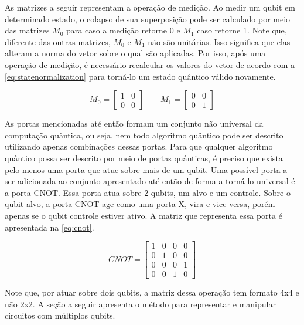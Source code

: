 As matrizes a seguir representam a operação de medição. Ao medir um qubit em determinado estado, o colapso de sua superposição pode ser calculado por meio das matrizes $M_0$ para caso a medição retorne 0 e $M_1$ caso retorne 1. Note que, diferente das outras matrizes, $M_0$ e $M_1$ não são unitárias. Isso significa que elas alteram a norma do vetor sobre o qual são aplicadas. Por isso, após uma operação de medição, é necessário recalcular os valores do vetor de acordo com a \cref{eq:statenormalization} para torná-lo um estado quântico válido novamente.

\begin{equation}
  \label{eq:measurementmatrices}
  M_0
  =
  \begin{bmatrix}
    1 & 0 \\
    0 & 0
  \end{bmatrix}
  \qquad
  M_1
  =
  \begin{bmatrix}
    0 & 0 \\
    0 & 1
  \end{bmatrix}
\end{equation}

As portas mencionadas até então formam um conjunto não universal da computação quântica, ou seja, nem todo algoritmo quântico pode ser descrito utilizando apenas combinações dessas portas. Para que qualquer algoritmo quântico possa ser descrito por meio de portas quânticas, é preciso que exista pelo menos uma porta que atue sobre mais de um qubit. Uma possível porta a ser adicionada ao conjunto apresentado até então de forma a torná-lo universal é a porta CNOT. Essa porta atua sobre 2 qubits, um alvo e um controle. Sobre o qubit alvo, a porta CNOT age como uma porta X,  vira  e vice-versa, porém apenas se o qubit controle estiver ativo. A matriz que representa essa porta é apresentada na \cref{eq:cnot}. 

\begin{equation}
  CNOT = \begin{bmatrix}
    1 & 0 & 0 & 0 \\
    0 & 1 & 0 & 0 \\
    0 & 0 & 0 & 1 \\
    0 & 0 & 1 & 0
  \end{bmatrix}
  \label{eq:cnot}
\end{equation}

Note que, por atuar sobre dois qubits, a matriz dessa operação tem formato 4x4 e não 2x2. A seção a seguir apresenta o método para representar e manipular circuitos com múltiplos qubits.

